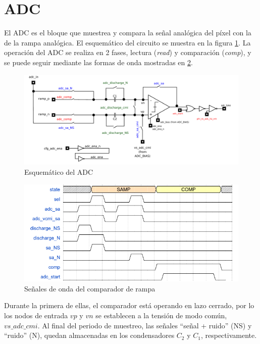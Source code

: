 \section{ADC}\label{cap:ro_sch_adc}

El ADC es el bloque que muestrea y compara la señal analógica del píxel con la de la
rampa analógica. El esquemático del circuito se muestra en la figura \ref{fig:adc_sch}.
La operación del ADC se realiza en 2 fases, lectura (\textit{read}) y comparación
(\textit{comp}), y se puede seguir mediante las formas de onda mostradas en \ref{fig:adc_wave}.\\

\begin{figure}[h]
	\includegraphics[width=\textwidth]{svg/adc_sch.pdf}
	\caption{Esquemático del ADC}
	\label{fig:adc_sch}
\end{figure}

\begin{figure}[h]
	\includegraphics[width=\textwidth]{img/adc_wave.png}
	\caption{Señales de onda del comparador de rampa}
	\label{fig:adc_wave}
\end{figure}

Durante la primera de ellas, el comparador está operando en lazo cerrado, por lo
los nodos de entrada $vp$ y $vn$ se establecen a la tensión de modo
común, $vs\_adc\_cmi$. Al final del periodo de muestreo, las señales
``señal + ruido'' (NS) y ``ruido'' (N), quedan almacenadas en los condensadores $C_2$
y $C_1$, respectivamente.\\

